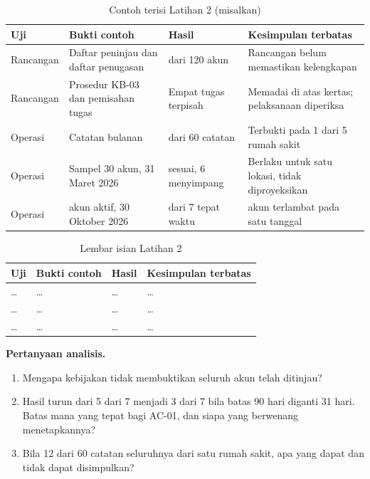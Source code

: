 \begin{table}[!htb]
  \centering\small
  \caption{Contoh terisi Latihan 2 (misalkan)}\label{tab:ch12-lat2-contoh}
  \begin{tabularx}{\textwidth}{|>{\raggedright\arraybackslash}p{}|>{\raggedright\arraybackslash}X|>{\raggedright\arraybackslash}p{}|>{\raggedright\arraybackslash}X|}
    \hline
    \textbf{Uji} & \textbf{Bukti contoh} & \textbf{Hasil} & \textbf{Kesimpulan terbatas} \\ \hline
    Rancangan & Daftar peninjau dan daftar penugasan & 108 dari 120 akun & Rancangan belum
    memastikan kelengkapan \\ \hline
    Rancangan & Prosedur KB-03 dan pemisahan tugas & Empat tugas terpisah & Memadai di atas kertas;
    pelaksanaan diperiksa \\ \hline
    Operasi & Catatan bulanan & 12 dari 60 catatan & Terbukti pada 1 dari 5 rumah sakit \\ \hline
    Operasi & Sampel 30 akun, 31 Maret 2026 & 24 sesuai, 6 menyimpang & Berlaku untuk satu lokasi,
    tidak diproyeksikan \\ \hline
    Operasi & 7 akun aktif, 30 Oktober 2026 & 5 dari 7 tepat waktu & 2 akun terlambat pada satu
    tanggal \\ \hline
  \end{tabularx}
\end{table}

\begin{table}[!htb]
  \centering\small
  \caption{Lembar isian Latihan 2}\label{tab:ch12-lat2-hasil}
  \begin{tabularx}{\textwidth}{|>{\raggedright\arraybackslash}p{}|>{\raggedright\arraybackslash}X|>{\raggedright\arraybackslash}p{}|>{\raggedright\arraybackslash}X|}
    \hline
    \textbf{Uji} & \textbf{Bukti contoh} & \textbf{Hasil} & \textbf{Kesimpulan terbatas} \\ \hline
    \dots & \dots & \dots & \dots \\ \hline
    \dots & \dots & \dots & \dots \\ \hline
    \dots & \dots & \dots & \dots \\ \hline
  \end{tabularx}
\end{table}

\textbf{Pertanyaan analisis.}
\begin{enumerate}
  \item Mengapa kebijakan tidak membuktikan seluruh akun telah ditinjau?
  \item Hasil turun dari 5 dari 7 menjadi 3 dari 7 bila batas 90 hari diganti 31 hari. Batas mana
  yang tepat bagi AC-01, dan siapa yang berwenang menetapkannya?
  \item Bila 12 dari 60 catatan seluruhnya dari satu rumah sakit, apa yang dapat dan tidak dapat
  disimpulkan?
\end{enumerate}

